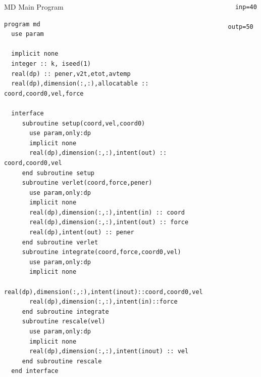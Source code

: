 \documentclass[slidestop,mathserif,compress,xcolor=svgnames]{beamer}
\newenvironment{bblock}[0]
{
\begin{beamerboxesrounded}[upper=uppercol1,lower=lowercol1,shadow=true]}
{\end{beamerboxesrounded}}
\newenvironment{eblock}[0]
{
\begin{beamerboxesrounded}[upper=uppercol2,lower=lowercol2,shadow=true]}
{\end{beamerboxesrounded}}
\begin{document}
\begin{frame}

  \framebreak

  {\fontsize{4}{5}
    \begin{columns}
      \column{5.5cm}
      \begin{eblock}{MD Main Program}
        \begin{verbatim}
program md
  use param

  implicit none
  integer :: k, iseed(1)
  real(dp) :: pener,v2t,etot,avtemp
  real(dp),dimension(:,:),allocatable :: coord,coord0,vel,force

  interface
     subroutine setup(coord,vel,coord0)   
       use param,only:dp
       implicit none
       real(dp),dimension(:,:),intent(out) :: coord,coord0,vel
     end subroutine setup
     subroutine verlet(coord,force,pener)
       use param,only:dp
       implicit none
       real(dp),dimension(:,:),intent(in) :: coord
       real(dp),dimension(:,:),intent(out) :: force
       real(dp),intent(out) :: pener
     end subroutine verlet
     subroutine integrate(coord,force,coord0,vel)
       use param,only:dp
       implicit none
       real(dp),dimension(:,:),intent(inout)::coord,coord0,vel
       real(dp),dimension(:,:),intent(in)::force
     end subroutine integrate
     subroutine rescale(vel)
       use param,only:dp
       implicit none
       real(dp),dimension(:,:),intent(inout) :: vel
     end subroutine rescale
  end interface
        \end{verbatim}
      \end{eblock}
      \column{5.5cm}
      \begin{eblock}{}
        \begin{verbatim}
  inp=40
  outp=50
  

\end{verbatim}
\end{eblock}
\end{columns}}
\end{frame}
\end{document}
